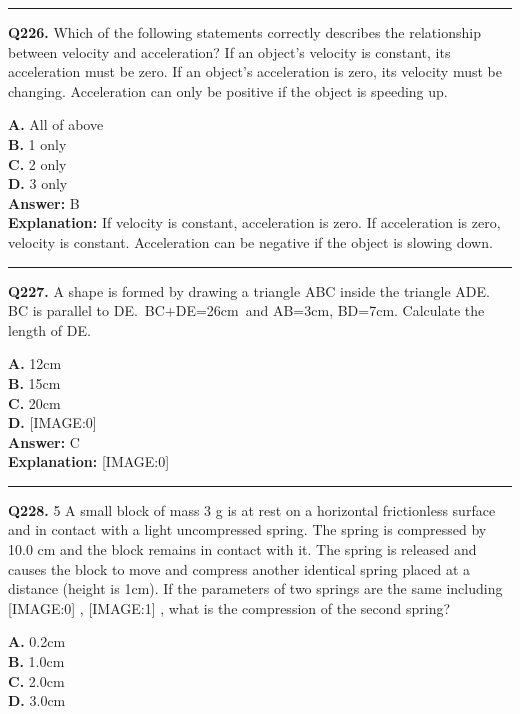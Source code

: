 \documentclass[12pt]{article}
\begin{document}
\hrule
\vspace{1em}


\noindent
\textbf{Q226.} Which of the following statements correctly describes the relationship between velocity and acceleration?
If an object's velocity is constant, its acceleration must be zero.
If an object's acceleration is zero, its velocity must be changing.
Acceleration can only be positive if the object is speeding up.



\textbf{A.} All of above \\
\textbf{B.} 1 only \\
\textbf{C.} 2 only \\
\textbf{D.} 3 only \\

\textbf{Answer:} B \\
\textbf{Explanation:} If velocity is constant, acceleration is zero. If acceleration is zero, velocity is constant. Acceleration can be negative if the object is slowing down.

\hrule
\vspace{1em}


\noindent
\textbf{Q227.} A shape is formed by drawing a triangle ABC inside the triangle ADE. BC is parallel to DE. BC+DE=26cm and AB=3cm, BD=7cm.
Calculate the length of DE.



\textbf{A.} 12cm \\
\textbf{B.} 15cm \\
\textbf{C.} 20cm \\
\textbf{D.} [IMAGE:0] \\

\textbf{Answer:} C \\
\textbf{Explanation:} [IMAGE:0]

\hrule
\vspace{1em}


\noindent
\textbf{Q228.} 5
A small block of mass 3 g is at rest on a horizontal frictionless surface and in contact with a light uncompressed spring. The spring is compressed by 10.0 cm and the block remains in contact with it. The spring is released and causes the block to move and compress another identical spring placed at a distance (height is 1cm). If the parameters of two springs are the same including
[IMAGE:0]
,
[IMAGE:1]
, what is the compression of the second spring?



\textbf{A.} 0.2cm \\
\textbf{B.} 1.0cm \\
\textbf{C.} 2.0cm \\
\textbf{D.} 3.0cm \\
\end{document}
